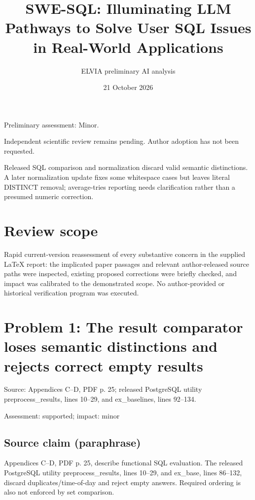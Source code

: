 \documentclass[11pt]{article}
\begin{document}
\title{SWE-SQL: Illuminating LLM Pathways to Solve User SQL Issues in Real-World Applications}

\author{ELVIA preliminary AI analysis}\date{21 October 2026}\maketitle

Preliminary assessment: Minor.\par

Independent scientific review remains pending. Author adoption has not been requested.

Released SQL comparison and normalization discard valid semantic distinctions. A later normalization update fixes some whitespace cases but leaves literal DISTINCT removal; average-tries reporting needs clarification rather than a presumed numeric correction.

\section*{Review scope}

Rapid current-version reassessment of every substantive concern in the supplied LaTeX report: the implicated paper passages and relevant author-released source paths were inspected, existing proposed corrections were briefly checked, and impact was calibrated to the demonstrated scope. No author-provided or historical verification program was executed.

\section*{Problem 1: The result comparator loses semantic distinctions and rejects correct empty results}

Source: Appendices C–D, PDF p. 25; released PostgreSQL utility preprocess\_results, lines 10–29, and ex\_baselines, lines 92–134.

Assessment: supported; impact: minor

\subsection*{Source claim (paraphrase)}

Appendices C–D, PDF p. 25, describe functional SQL evaluation. The released PostgreSQL utility preprocess\_results, lines 10–29, and ex\_base, lines 86–132, discard duplicates/time-of-day and reject empty answers. Required ordering is also not enforced by set comparison.
\end{document}

